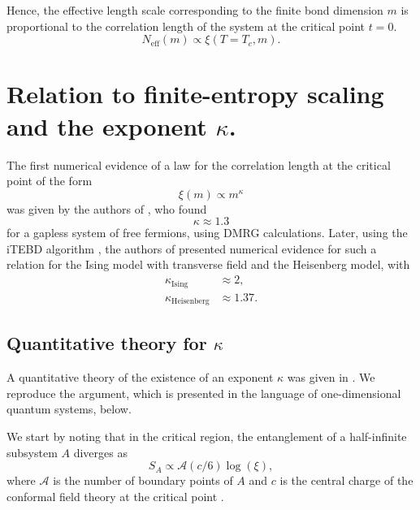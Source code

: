 Hence, the effective length scale corresponding to the finite bond dimension $m$ is
proportional to the correlation length of the system at the critical point $t = 0$.
\begin{equation}
  N_{\text{eff}}(m) \propto \xi(T = T_c, m).
\end{equation}


\section{Relation to finite-entropy scaling and the exponent $\kappa$.}


The first numerical evidence of a law for the correlation length at the critical point of the form
\begin{equation}\label{eq:xi_propto_m_kappa}
  \xi(m) \propto m^{\kappa}
\end{equation}
was given by the authors of \cite{andersson1999density}, who found
\begin{equation}
  \kappa \approx 1.3
\end{equation}
for a gapless system of free fermions, using DMRG calculations. Later, using the iTEBD algorithm
\cite{vidal2007classical}, the authors of \cite{tagliacozzo2008scaling} presented numerical evidence for such a relation
for the Ising model with transverse field and the Heisenberg model, with
\begin{align}
  \kappa_{\text{Ising}} & \approx 2, \\
  \kappa_{\text{Heisenberg}} & \approx 1.37.
\end{align}

\subsection{Quantitative theory for $\kappa$}
A quantitative theory of the existence of an exponent $\kappa$ was given in \cite{pollmann2009theory}.
We reproduce the argument, which is presented in the language of one-dimensional quantum systems, below.

We start by noting that in the critical region, the entanglement of a half-infinite subsystem $A$ diverges as
\begin{equation}\label{eq:entropy_scaling_near_criticality}
  S_A \propto \mathcal{A}(c/6)\log(\xi),
\end{equation}
where $\mathcal{A}$ is the number of boundary points of $A$ and $c$ is the central charge of the conformal field theory
at the critical point \cite{calabrese2004entanglement, vidal2003entanglement, ercolessi2010exact}.

